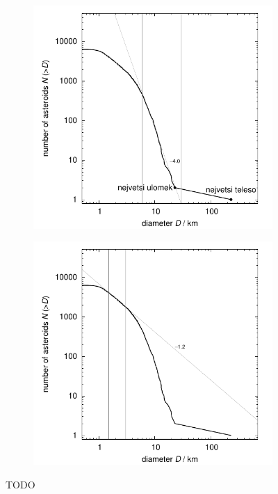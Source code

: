\documentclass[A4paper, 12pt, oneside]{book}
\begin{document}
\begin{figure}
	\centering
	\begin{subfigure}[b]{0.45\textwidth}
	\includegraphics[width=\textwidth]{obr/size_distribution}
	\end{subfigure}
	\begin{subfigure}[b]{0.45\textwidth}
	\includegraphics[width=\textwidth]{obr/size_distribution_SMALLD}
	\end{subfigure}
	\caption{TODO}
	\label{size_distribution}
\end{figure}
\end{document}
